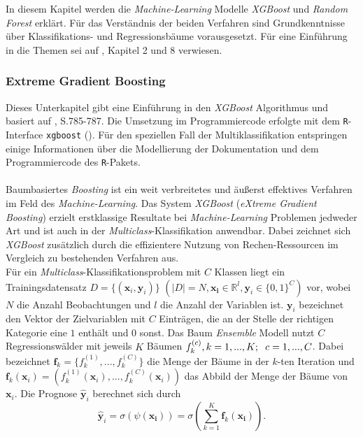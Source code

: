 \documentclass[a4paper,11pt]{article}
\begin{document}
In diesem Kapitel werden die \textit{Machine-Learning} Modelle \textit{XGBoost} und \textit{Random Forest} erklärt. Für das Verständnis der beiden Verfahren sind Grundkenntnisse über Klassifikations- und Regressionsbäume vorausgesetzt. Für eine Einführung in die Themen sei auf \cite{CART}, Kapitel 2 und 8 verwiesen.



\subsubsection{Extreme Gradient Boosting}\label{kap:XG}

Dieses Unterkapitel gibt eine Einführung in den \textit{XGBoost} Algorithmus und basiert auf \cite{XGBoost}, S.785-787. Die Umsetzung im Programmiercode erfolgte mit dem \texttt{R}-Interface \texttt{xgboost} (\cite{XGBoostR}). Für den speziellen Fall der Multiklassifikation entspringen einige Informationen über die Modellierung der Dokumentation und dem Programmiercode des \texttt{R}-Pakets.\\
\\
Baumbasiertes \textit{Boosting} ist ein weit verbreitetes und äußerst effektives Verfahren im Feld des \textit{Machine-Learning}. Das System \textit{XGBoost} (\textit{eXtreme Gradient Boosting}) erzielt erstklassige Resultate bei \textit{Machine-Learning} Problemen jedweder Art und ist auch in der \textit{Multi\-class}-Klassifikation anwendbar. Dabei zeichnet sich \textit{XGBoost} zusätzlich durch die effizientere Nutzung von Rechen-Ressourcen im Vergleich zu bestehenden Verfahren aus. \\
Für ein \textit{Multiclass}-Klassifikationsproblem mit $C$ Klassen liegt ein Trainingsdatensatz $D = \{(\bm{x}_i, \bm{y}_i) \}$ $(|D| = N, \bm{x_i} \in \mathbb{R}^l, \bm{y}_i \in \{0,1\}^C)$ vor, wobei $N$ die Anzahl Beobachtungen und $l$ die Anzahl der Variablen ist. $\bm{y}_i$ bezeichnet den Vektor der Zielvariablen mit $C$ Einträgen, die an der Stelle der richtigen Kategorie eine $1$ enthält und $0$ sonst. Das Baum \textit{Ensemble} Modell nutzt $C$ Regressionswälder mit jeweils $K$ Bäumen $f_k^{(c)}, k=1,...,K ;\hspace{0.2cm} c = 1,...,C$. Dabei bezeichnet $\bm{f}_k = \{f_k^{(1)},...,f_k^{(C)}\}$ die Menge der Bäume in der $k$-ten Iteration und $\bm{f}_k(\bm{x}_i) = (f_k^{(1)}(\bm{x}_i),...,f_k^{(C)}(\bm{x}_i))$ das Abbild der Menge der Bäume von $\bm{x}_i$. Die Prognose $\hat{\bm{y}}_i$ berechnet sich durch
\begin{equation}\label{eq:0}
    \hat{\bm{y}}_i = \sigma(\psi(\bm{x_i})) = \sigma( \sum_{k=1}^K \bm{f}_k(\bm{x_i})).
\end{equation}{}
\end{document}
